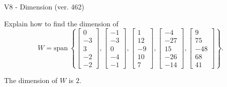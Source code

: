 \begin{exercise}
  \begin{exerciseTitle}V8 - Dimension (ver. 462)\end{exerciseTitle}
  \begin{exerciseStatement}
    Explain how to find the dimension of 
\[W=\mathrm{span}\ \left\{\left[\begin{array}{r}
0 \\
-3 \\
3 \\
-2 \\
-2
\end{array}\right] , \left[\begin{array}{r}
-1 \\
-3 \\
0 \\
-4 \\
-1
\end{array}\right] , \left[\begin{array}{r}
1 \\
12 \\
-9 \\
10 \\
7
\end{array}\right] , \left[\begin{array}{r}
-4 \\
-27 \\
15 \\
-26 \\
-14
\end{array}\right] , \left[\begin{array}{r}
9 \\
75 \\
-48 \\
68 \\
41
\end{array}\right]\right\}.\]



  \end{exerciseStatement}
  \begin{exerciseAnswer}
   The dimension of \(W\) is  \(2\).
  


  \end{exerciseAnswer}
\end{exercise}